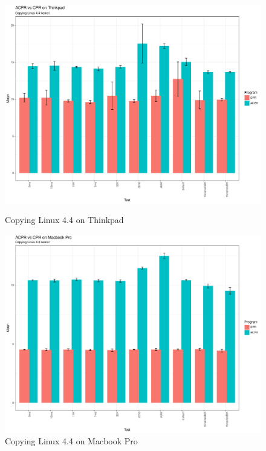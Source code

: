 \documentclass[11pt]{article}
\begin{document}
\begin{figure}[ht!]
        \begin{minipage}{.33\textwidth}
                \includegraphics[width=1.8\textwidth,]{Laptop_Linux_Barplot.pdf}
                \caption{Copying Linux 4.4 on Thinkpad}
                \label{fig:laptop_linux}
        \end{minipage}
        \hspace{3cm}
        \begin{minipage}{.33\textwidth}
                \centering
                \includegraphics[width=1.8\textwidth,]{Macbook_Linux_Barplot.pdf}
                \caption{Copying Linux 4.4 on Macbook Pro}
                \label{fig:macbook_linux}
        \end{minipage}
\end{figure}
\end{document}
